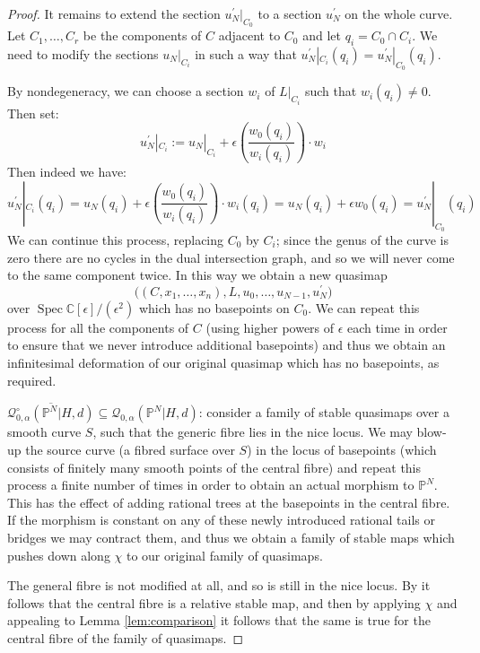 \documentclass[11pt]{amsart}
\newcommand{\Q}[4]{\mathcal{Q}_{#1,#2}(#3,#4)}
\newcommand{\PP}{\mathbb P}
\newcommand{\Spec}{\operatorname{Spec}}
\newcommand{\CC}{\mathbb{C}}
\theoremstyle{definition}
\theoremstyle{definition}
\begin{document}
\begin{proof}
It remains to extend the section $u_N^\prime|_{C_0}$ to a section $u_N^\prime$ on the whole curve. Let $C_1, \ldots, C_r$ be the components of $C$ adjacent to $C_0$ and let $q_i = C_0 \cap C_i$. We need to modify the sections $u_N|_{C_i}$ in such a way that $u_N^\prime|_{C_i}(q_i) = u_N^\prime|_{C_0}(q_i)$.

By nondegeneracy, we can choose a section $w_i$ of $L|_{C_i}$ such that $w_i(q_i) \neq 0$. Then set:
\begin{equation*} {u_N^\prime}|_{C_i} := {u_N}|_{C_i} + \epsilon \left( \frac{w_0(q_i)}{w_i(q_i)} \right) \cdot w_i \end{equation*}
Then indeed we have:
\begin{equation*} {u_N^\prime}|_{C_i}(q_i) = u_N(q_i) + \epsilon \left( \frac{w_0(q_i)}{w_i(q_i)} \right) \cdot w_i(q_i) = u_N(q_i) + \epsilon w_0(q_i) = {u_N^\prime}|_{C_0}(q_i) \end{equation*}
We can continue this process, replacing $C_0$ by $C_i$; since the genus of the curve is zero there are no cycles in the dual intersection graph, and so we will never come to the same component twice. In this way we obtain a new quasimap
\begin{equation*} \big((C,x_1,\ldots,x_n),L,u_0, \ldots, u_{N-1}, u_N^\prime\big) \end{equation*}
over $\Spec \CC[\epsilon]/(\epsilon^2)$ which has no basepoints on $C_0$. We can repeat this process for all the components of $C$ (using higher powers of $\epsilon$ each time in order to ensure that we never introduce additional basepoints) and thus we obtain an infinitesimal deformation of our original quasimap which has no basepoints, as required.

$\overline{\mathcal{Q}^{\circ}_{0,\alpha}(\PP^N|H,d)}\subseteq\Q{0}{\alpha}{\PP^N|H}{d}$: consider a family of stable quasimaps over a smooth curve $S$, such that the generic fibre lies in the nice locus. We may  blow-up the source curve (a fibred surface over $S$) in the locus of basepoints (which consists of finitely many smooth points of the central fibre) and repeat this process a finite number of times in order to obtain an actual morphism to $\PP^N$. This has the effect of adding rational trees at the basepoints in the central fibre. If the morphism is constant on any of these newly introduced rational tails or bridges we may contract them, and thus we obtain a family of stable maps which pushes down along $\chi$ to our original family of quasimaps.

The general fibre is not modified at all, and so is still in the nice locus. By \cite[Lemma 1.9]{Ga} it follows that the central fibre is a relative stable map, and then by applying $\chi$ and appealing to Lemma \ref{lem:comparison} it follows that the same is true for the central fibre of the family of quasimaps. \end{proof}
\end{document}
